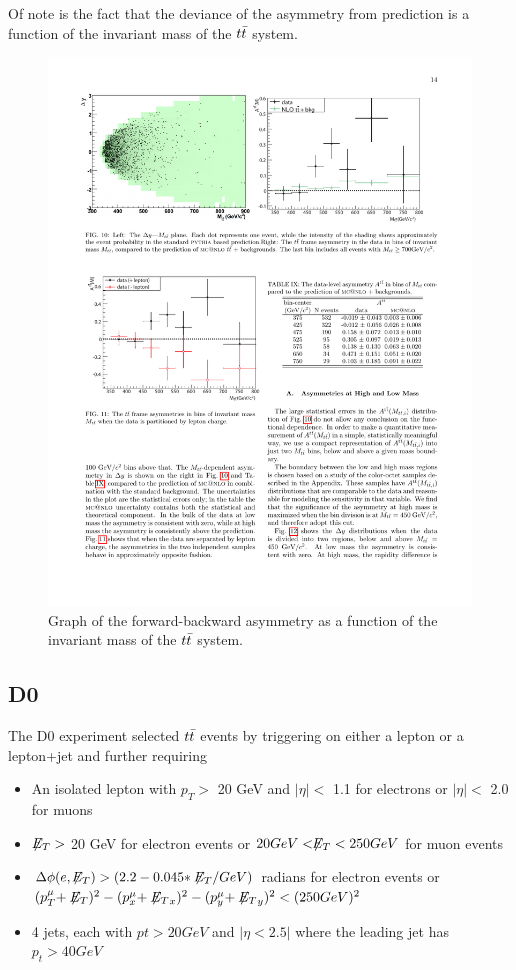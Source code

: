 Of note is the fact that the deviance of the asymmetry from prediction is a function of the invariant mass of the $t\bar{t}$ system.

\begin{figure}
  \begin{center}
    \includegraphics[width=125mm]{figures/theory/CDFAsymmetryMass}
  \end{center}
  \caption{Graph of the forward-backward asymmetry as a function of the invariant mass of the $t\bar{t}$ system.}
  \label{img:CDFAsymmetryMass}
\end{figure}


\subsection{D0}

The D0 experiment selected $t\bar{t}$ events by triggering on either a lepton or a lepton+jet and further requiring
\begin{itemize}
  \item An isolated lepton with $p_T >$ 20 GeV and $|\eta| <$ 1.1 for electrons or $|\eta| <$ 2.0 for muons
  \item $\not\!\!{E_{T}} >$ 20 GeV for electron events or $20 GeV < \not\!\!{E_{T}} < 250 GeV$ for muon events
  \item $\Delta \phi(e, \not\!\!{E_{T}}) > (2.2 - 0.045*\not\!\!{E_{T}} / GeV)$ radians for electron events or $(p_T^\mu + \not\!\!{E_{T}})^2 - (p_x^\mu + \not\!\!{E_{T}}_x)^2 - (p_y^\mu + \not\!\!{E_{T}}_y)^2 < (250 GeV)^2$
  \item 4 jets, each with $pt > 20 GeV$ and $|\eta < 2.5|$ where the leading jet has $p_t > 40 GeV$
\end{itemize}

